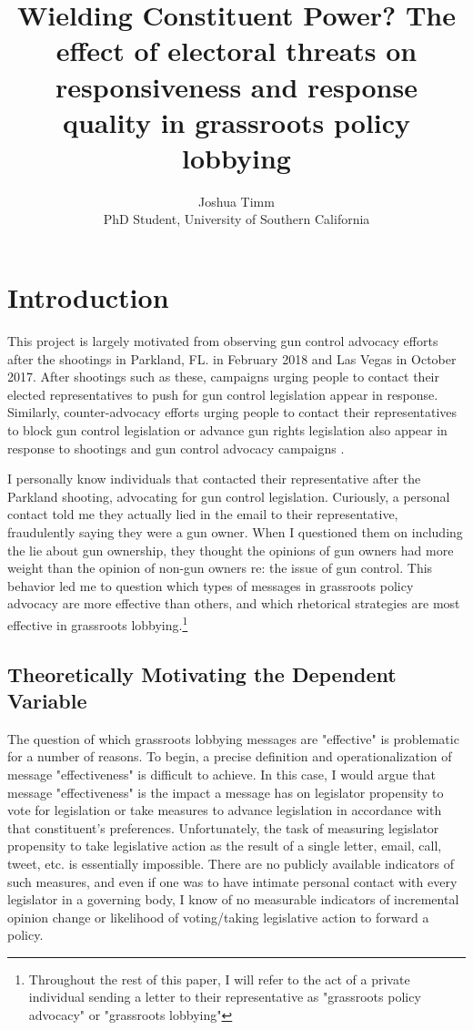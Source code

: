 \documentclass[12pt]{article}
\title{Wielding Constituent Power? The effect of electoral threats on responsiveness and response quality in grassroots policy lobbying}
\author{Joshua Timm \\
PhD Student, University of Southern California}
\begin{document}
\maketitle


 
\section{Introduction}
This project is largely motivated from observing gun control advocacy efforts after the shootings in Parkland, FL. in February 2018 and Las Vegas in October 2017. After shootings such as these, campaigns urging people to contact their elected representatives to push for gun control legislation appear in response\citep{Henschel:aa, Brinlee:2018aa, SIlverberg:2016aa}. Similarly, counter-advocacy efforts urging people to contact their representatives to block gun control legislation or advance gun rights legislation also appear in response to shootings and gun control advocacy campaigns \citep{Scott-Wong:2018aa, Marans:2018aa}.

I personally know individuals that contacted their representative after the Parkland shooting, advocating for gun control legislation. Curiously, a personal contact told me they actually lied in the email to their representative, fraudulently saying they were a gun owner. When I questioned them on including the lie about gun ownership, they thought the opinions of gun owners had more weight than the opinion of non-gun owners re: the issue of gun control. This behavior led me to question which types of messages in grassroots policy advocacy are more effective than others, and which rhetorical strategies are most effective in grassroots lobbying.\footnote{Throughout the rest of this paper, I will refer to the act of a private individual sending a letter to their representative as "grassroots policy advocacy" or "grassroots lobbying"}
\subsection{Theoretically Motivating the Dependent Variable}
The question of which grassroots lobbying messages are "effective" is problematic for a number of reasons. To begin, a precise definition and operationalization of message "effectiveness" is difficult to achieve. In this case, I would argue that message "effectiveness" is the impact a message has on legislator propensity to vote for legislation or take measures to advance legislation in accordance with that constituent's preferences. Unfortunately, the task of measuring legislator propensity to take legislative action as the result of a single letter, email, call, tweet, etc. is essentially impossible. There are no publicly available indicators of such measures, and even if one was to have intimate personal contact with every legislator in a governing body, I know of no measurable indicators of incremental opinion change or likelihood of voting/taking legislative action to forward a policy.
\end{document}
